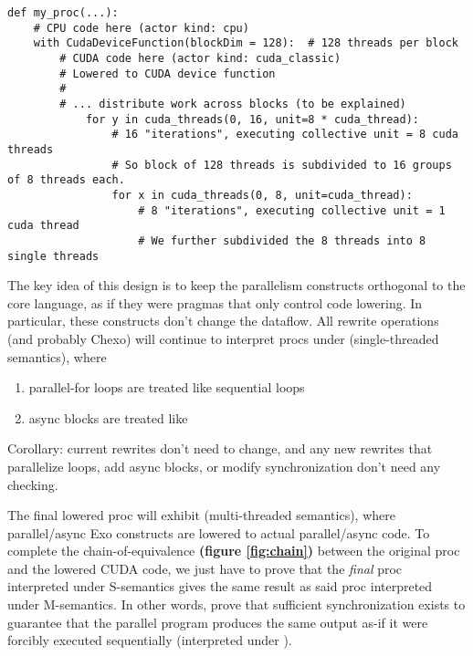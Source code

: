 \filbreak
{}
{\color{lightttColor}
\begin{verbatim}
def my_proc(...):
    # CPU code here (actor kind: cpu)
    with CudaDeviceFunction(blockDim = 128):  # 128 threads per block
        # CUDA code here (actor kind: cuda_classic)
        # Lowered to CUDA device function
        #
        # ... distribute work across blocks (to be explained)
            for y in cuda_threads(0, 16, unit=8 * cuda_thread):
                # 16 "iterations", executing collective unit = 8 cuda threads
                # So block of 128 threads is subdivided to 16 groups of 8 threads each.
                for x in cuda_threads(0, 8, unit=cuda_thread):
                    # 8 "iterations", executing collective unit = 1 cuda thread
                    # We further subdivided the 8 threads into 8 single threads

\end{verbatim}
}

\filbreak
{}

The key idea of this design is to keep the parallelism constructs orthogonal to the core language, as if they were pragmas that only control code lowering.
In particular, these constructs don't change the dataflow.
All rewrite operations (and probably Chexo) will continue to interpret procs under  (single-threaded semantics), where
\begin{enumerate}
  \item parallel-for loops are treated like sequential loops
  \item async blocks are treated like 
\end{enumerate}

\filbreak
Corollary: current rewrites don't need to change, and any new rewrites that parallelize loops, add async blocks, or modify synchronization don't need any checking.

\filbreak
The final lowered proc will exhibit  (multi-threaded semantics), where parallel/async Exo constructs are lowered to actual parallel/async code.
To complete the chain-of-equivalence \textbf{(figure \ref{fig:chain})} between the original proc and the lowered CUDA code, we just have to prove that the \textit{final} proc interpreted under S-semantics gives the same result as said proc interpreted under M-semantics.
In other words, prove that sufficient synchronization exists to guarantee that the parallel program produces the same
output as-if it were forcibly executed sequentially (interpreted under ).

